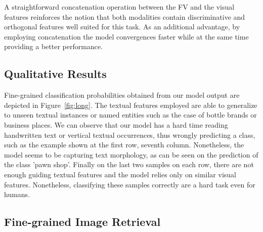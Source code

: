 \documentclass[10pt,twocolumn,letterpaper]{article}
\begin{document}
A straightforward concatenation operation between the FV and the visual features reinforces the notion that both modalities contain discriminative and orthogonal features well suited for this task. As an additional advantage, by employing concatenation the model convergences faster while at the same time providing a better performance.

\subsection{Qualitative Results}

Fine-grained classification probabilities obtained from our model output are depicted in Figure~\ref{fig:long}. The textual features employed are able to generalize to unseen textual instances or named entities such as the case of bottle brands or business places. 
We can observe that our model has a hard time reading handwritten text or vertical textual occurrences, thus wrongly predicting a class, such as the example shown at the first row, seventh column. Nonetheless, the model seems to be capturing text morphology, as can be seen on the prediction of the class 'pawn shop'. 
Finally on the last two samples on each row, there are not enough guiding textual features and the model relies only on similar visual features. Nonetheless, classifying these samples correctly are a hard task even for humans.


\subsection{Fine-grained Image Retrieval}
\end{document}
